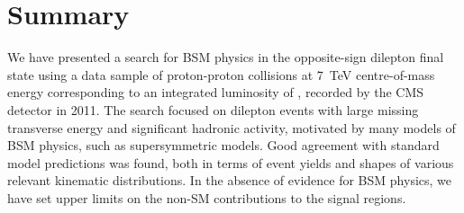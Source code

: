 \section{Summary}
\label{sec:conclusion}

We have presented a search for BSM physics in the opposite-sign dilepton final state using 
a data sample of proton-proton collisions at 7~TeV centre-of-mass energy corresponding to an integrated
luminosity of \lumifinal, recorded by the CMS detector in 2011.
The search focused on dilepton events with large missing transverse energy and significant hadronic activity,
motivated by many models of BSM physics, such as supersymmetric models.
Good agreement with standard model predictions was found, both in terms of event yields and shapes of 
various relevant kinematic distributions. In the absence of evidence for BSM physics, 
we have set upper limits on the non-SM contributions to the signal regions. 
